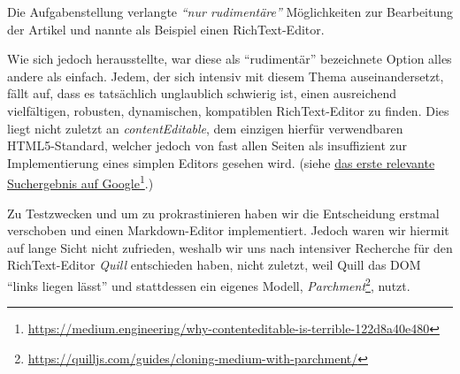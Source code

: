 Die Aufgabenstellung verlangte \emph{``nur rudimentäre''}
Möglichkeiten zur Bearbeitung der Artikel
und nannte als Beispiel einen RichText-Editor.

Wie sich jedoch herausstellte,
war diese als ``rudimentär'' bezeichnete Option
alles andere als einfach.
Jedem,
der sich intensiv mit diesem Thema auseinandersetzt,
fällt auf,
dass es tatsächlich unglaublich schwierig ist,
einen ausreichend vielfältigen, robusten, dynamischen, kompatiblen
RichText-Editor zu finden.
Dies liegt nicht zuletzt an \emph{contentEditable}, dem einzigen hierfür verwendbaren HTML5-Standard,
welcher jedoch von fast allen Seiten als insuffizient
zur Implementierung eines simplen Editors gesehen wird.
(siehe \href{https://medium.engineering/why-contenteditable-is-terrible-122d8a40e480}%
{das erste relevante Suchergebnis auf Google}\footnote{\url{https://medium.engineering/why-contenteditable-is-terrible-122d8a40e480}}.)

Zu Testzwecken und um zu prokrastinieren haben wir die Entscheidung erstmal verschoben
und einen Markdown-Editor implementiert.
Jedoch waren wir hiermit auf lange Sicht nicht zufrieden,
weshalb wir uns nach intensiver Recherche für den RichText-Editor \emph{Quill} entschieden haben,
nicht zuletzt, weil Quill
das DOM ``links liegen lässt'' und stattdessen ein eigenes Modell,
\emph{Parchment}\footnote{\url{https://quilljs.com/guides/cloning-medium-with-parchment/}},
nutzt.
